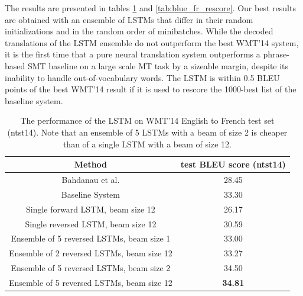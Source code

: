 The results are presented in tables \ref{tab:blue_fr} and
\ref{tab:blue_fr_rescore}.  Our best results are obtained with an
ensemble of LSTMs that differ in their random initializations and
in the random order of minibatches.  While the decoded translations of the
LSTM ensemble do not outperform the best WMT'14 system, it is the first time
that a pure neural translation system outperforms a 
phrase-based SMT baseline on a large scale MT task by a sizeable margin,
despite its inability to handle out-of-vocabulary words.  The LSTM
is within 0.5 BLEU points of the best WMT'14 result if it is used to rescore the 1000-best
list of the baseline system.

\begin{table}[t]
\centering
\begin{small}
\begin{tabular}{|c|c|}
\hline
{\bf Method}  & {\bf test BLEU score (ntst14) } \\ \hline
Bahdanau et al. \cite{bog14}  &  28.45 \\ \hline
Baseline System  \cite{wmt14_en_fr} & 33.30 \\ \hline
\hline
Single forward LSTM, beam size 12 & 26.17 \\ \hline                 
Single reversed LSTM, beam size 12 & 30.59 \\ \hline
Ensemble of 5 reversed LSTMs, beam size 1  &  33.00 \\ \hline
Ensemble of 2 reversed LSTMs, beam size 12  &  33.27 \\ \hline
Ensemble of 5 reversed LSTMs, beam size 2  &  34.50 \\ \hline
Ensemble of 5 reversed LSTMs, beam size 12  &  {\bf 34.81} \\ \hline
\end{tabular}
\end{small}
\caption{The performance of the LSTM on WMT'14 English to French test
  set (ntst14).  Note that an ensemble of 5 LSTMs with a beam of size
  2 is cheaper than of a single LSTM with a beam of size 12.  }
\label{tab:blue_fr}
\end{table}

